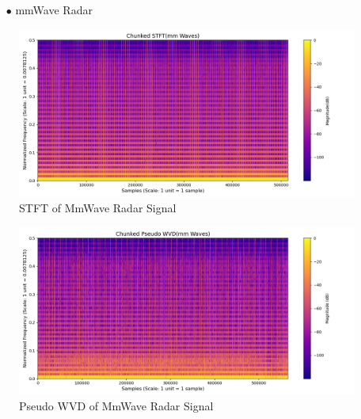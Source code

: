 \documentclass[12pt,a4paper,onecolumn]{exam}
\begin{document}
\begin{solution}
  \begin{itemize}
    \item[$\bullet$] mmWave Radar
  \end{itemize}

        \begin{figure}[H]
        \centering
        \includegraphics[scale = 0.45]{mmWaves_stft.png}
        \caption{STFT of MmWave Radar Signal}
        \label{fig:33}
        \end{figure}

        \begin{figure}[H]
        \centering
        \includegraphics[scale = 0.45]{mmWaves_pwvd.png}
        \caption{Pseudo WVD of MmWave Radar Signal}
        \label{fig:34}
        \end{figure}    


\end{solution}
\end{document}
